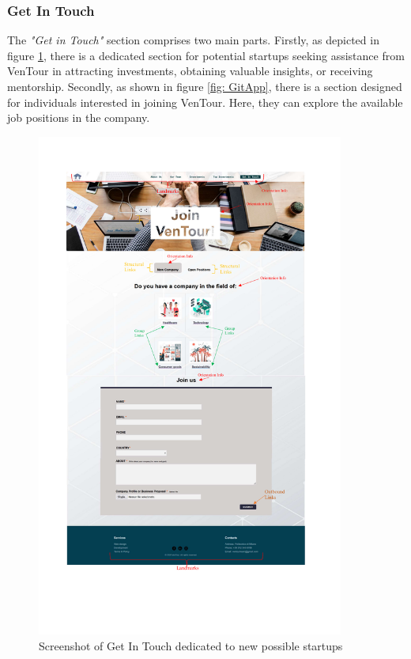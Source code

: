\documentclass[../../DD.tex]{subsubfiles}
\begin{document}
  \subsubsection{Get In Touch}
	The \textit{"Get in Touch"} section comprises two main parts. Firstly, as depicted in figure \ref{fig: GitST}, there is a dedicated section for potential startups seeking assistance from VenTour in attracting investments, obtaining valuable insights, or receiving mentorship. Secondly, as shown in figure \ref{fig: GitApp}, there is a section designed for individuals interested in joining VenTour. Here, they can explore the available job positions in the company.
		\begin{figure}[!htb]
		    \centering
		    \includegraphics[width=0.9\textwidth, trim=0 100 0 50, clip]{Images/screenshots/Get In Touch.pdf}
		    \caption{Screenshot of Get In Touch dedicated to new possible startups}
		    \label{fig: GitST}
		\end{figure}
\end{document}
